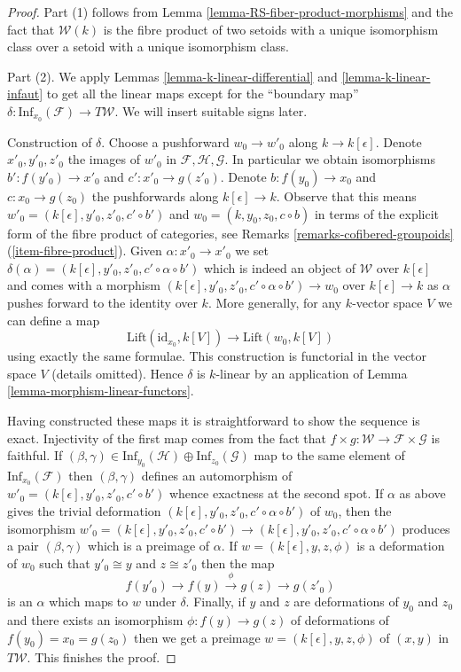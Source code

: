 \begin{proof}
Part (1) follows from Lemma \ref{lemma-RS-fiber-product-morphisms}
and the fact that $\mathcal{W}(k)$ is the fibre product of
two setoids with a unique isomorphism class over a setoid with
a unique isomorphism class.

\medskip\noindent
Part (2). We apply Lemmas \ref{lemma-k-linear-differential} and
\ref{lemma-k-linear-infaut} to get all the linear maps
except for the ``boundary map''
$\delta : \text{Inf}_{x_0}(\mathcal{F}) \to T\mathcal{W}$.
We will insert suitable signs later.

\medskip\noindent
Construction of $\delta$. Choose a pushforward $w_0 \to w'_0$ along
$k \to k[\epsilon]$. Denote $x'_0, y'_0, z'_0$ the images of $w'_0$ in
$\mathcal{F}, \mathcal{H}, \mathcal{G}$. In particular
we obtain isomorphisms $b' : f(y'_0) \to x'_0$ and $c' : x'_0 \to g(z'_0)$.
Denote $b : f(y_0) \to x_0$ and $c : x_0 \to g(z_0)$ the pushforwards
along $k[\epsilon] \to k$. Observe that this means
$w'_0 = (k[\epsilon], y'_0, z'_0, c' \circ b')$ and
$w_0 = (k, y_0, z_0, c \circ b)$ in terms of the explicit form
of the fibre product of categories,
see Remarks \ref{remarks-cofibered-groupoids} (\ref{item-fibre-product}).
Given $\alpha : x'_0 \to x'_0$ we set
$\delta(\alpha) = (k[\epsilon], y'_0, z'_0, c' \circ \alpha \circ b')$
which is indeed an object of $\mathcal{W}$ over $k[\epsilon]$ and comes
with a morphism $(k[\epsilon], y'_0, z'_0, c' \circ \alpha \circ b') \to w_0$
over $k[\epsilon] \to k$ as $\alpha$ pushes forward to the identity over $k$.
More generally, for any $k$-vector space $V$ we can define a map
$$
\text{Lift}(\text{id}_{x_0}, k[V])
\longrightarrow
\text{Lift}(w_0, k[V])
$$
using exactly the same formulae. This construction is functorial
in the vector space $V$ (details omitted). Hence $\delta$ is $k$-linear
by an application of
Lemma \ref{lemma-morphism-linear-functors}.

\medskip\noindent
Having constructed these maps it is straightforward to show the sequence
is exact. Injectivity of the first map comes from the fact that
$f \times g : \mathcal{W} \to \mathcal{F} \times \mathcal{G}$
is faithful. If
$(\beta, \gamma) \in
\text{Inf}_{y_0}(\mathcal{H}) \oplus \text{Inf}_{z_0}(\mathcal{G})$
map to the same element of $\text{Inf}_{x_0}(\mathcal{F})$ then
$(\beta, \gamma)$ defines an automorphism of
$w'_0 = (k[\epsilon], y'_0, z'_0, c' \circ b')$ whence exactness
at the second spot. If $\alpha$ as above gives the trivial deformation
$(k[\epsilon], y'_0, z'_0, c' \circ \alpha \circ b')$
of $w_0$, then the isomorphism
$w'_0 = (k[\epsilon], y'_0, z'_0, c' \circ b') \to
(k[\epsilon], y'_0, z'_0, c' \circ \alpha \circ b')$
produces a pair $(\beta, \gamma)$ which is a preimage of $\alpha$.
If $w = (k[\epsilon], y, z, \phi)$ is a deformation of $w_0$
such that $y'_0 \cong y$ and $z \cong z'_0$ then the map
$$
f(y'_0) \to f(y) \xrightarrow{\phi} g(z) \to g(z'_0)
$$
is an $\alpha$ which maps to $w$ under $\delta$.
Finally, if $y$ and $z$ are deformations of $y_0$ and $z_0$
and there exists an isomorphism $\phi : f(y) \to g(z)$ of deformations
of $f(y_0) = x_0 = g(z_0)$ then we get a preimage
$w = (k[\epsilon], y, z, \phi)$ of $(x, y)$ in $T\mathcal{W}$.
This finishes the proof.
\end{proof}
